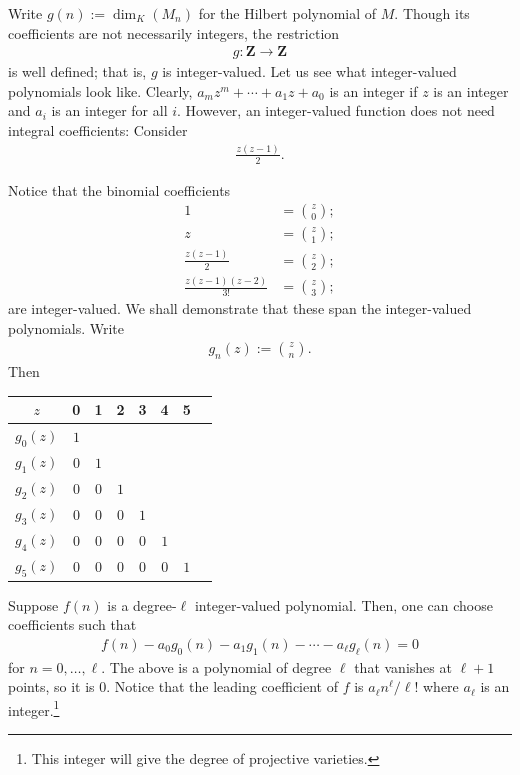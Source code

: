 \documentclass [11 pt, oneside] {article}
\begin{document}
Write $g(n) := \dim_K(M_n)$ for the Hilbert polynomial of $M$. Though its coefficients are not necessarily integers, the restriction
\begin{align*}
	g:\mathbf{Z}\longrightarrow \mathbf{Z}
\end{align*}
is well defined; that is, $g$ is integer-valued. Let us see what integer-valued polynomials look like. Clearly, $a_mz^m + \cdots + a_1z + a_0$ is an integer if $z$ is an integer and $a_i$ is an integer for all $i$. However, an integer-valued function does not need integral coefficients: Consider
\begin{align*}
	\frac{z(z-1)}{2}.
\end{align*}

Notice that the binomial coefficients
\begin{align*}
	1 &= \binom{z}{0};\\
	z &= \binom{z}{1};\\
	\frac{z(z-1)}{2} &= \binom{z}{2};\\
	\frac{z(z-1) (z-2)}{3!}&= \binom{z}{3};
\end{align*}
are integer-valued. We shall demonstrate that these span the integer-valued polynomials. Write 
\begin{align*}
	g_n(z) := \binom{z}{n}.
\end{align*}
Then
\begin{center}
	\begin{tabular}{cccccccc}
		$z$&0&1&2&3&4&5\\
    		\midrule
		 $g_0(z)$& $1$ &     &     &    \\
		 $g_1(z)$& $0$ & $1$ &     &    \\
		 $g_2(z)$& $0$ & $0$ & $1$ &    \\
		 $g_3(z)$& $0$ & $0$ & $0$ & $1$\\
		 $g_4(z)$& $0$ & $0$ & $0$ & $0$ & $1$\\
		 $g_5(z)$& $0$ & $0$ & $0$ & $0$ & $0$ & $1$
	\end{tabular}
\end{center}
Suppose $f(n)$ is a degree-$\ell$ integer-valued polynomial. Then, one can choose coefficients such that
\begin{align*}
	f(n) -  a_0g_0(n) -  a_1g_1(n) - \cdots - a_\ell g_\ell (n) =0
\end{align*}
for $n = 0,\hdots, \ell$. The above is a polynomial of degree $\ell$ that vanishes at $\ell + 1$ points, so it is $0$. Notice that the leading coefficient of $f$ is $a_\ell n^\ell / \ell!$ where $a_\ell$ is an integer.\footnote{This integer will give the degree of projective varieties.}
\end{document}

